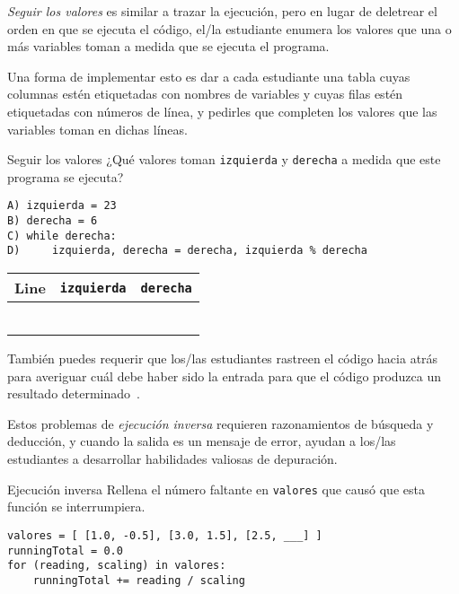 \emph{Seguir los valores} es similar a trazar la ejecución, 
pero en lugar de deletrear el orden en que se ejecuta el código, 
el/la estudiante enumera los valores que una o más variables toman
 a medida que se ejecuta el programa.

Una forma de implementar esto es dar a cada estudiante una tabla 
cuyas columnas estén etiquetadas con nombres de variables 
y cuyas filas estén etiquetadas con números de línea, 
y pedirles que completen los valores que las variables toman en dichas líneas.

\newpage
\begin{aside}{Seguir los valores}
  ¿Qué valores toman \texttt{izquierda} y \texttt{derecha} a medida que este programa se ejecuta?

\begin{verbatim}
A) izquierda = 23
B) derecha = 6
C) while derecha:
D)     izquierda, derecha = derecha, izquierda % derecha
\end{verbatim}
\end{aside}

\begin{center}
\begin{tabular}{|l|l|l|}
  \hline
  Line & \texttt{izquierda} & \texttt{derecha} \\
  \hline
  & & \\
  \hline
  & & \\
  \hline
  & & \\
  \hline
  & & \\
  \hline
  & & \\
  \hline
  & & \\
  \hline
\end{tabular}
\end{center}

También puedes requerir que  los/las estudiantes rastreen el código hacia atrás para averiguar cuál debe haber sido la entrada para que el código produzca un resultado determinado~\cite{Armo2008}.


Estos problemas de  \emph{ejecución inversa} requieren razonamientos de búsqueda y deducción, 
y cuando la salida es un mensaje de error, 
ayudan a los/las estudiantes a desarrollar habilidades valiosas de depuración.

\begin{aside}{Ejecución inversa}
  Rellena el número faltante en \texttt{valores}
  que causó que esta función se interrumpiera.

\begin{verbatim}
valores = [ [1.0, -0.5], [3.0, 1.5], [2.5, ___] ]
runningTotal = 0.0
for (reading, scaling) in valores:
    runningTotal += reading / scaling
\end{verbatim}
\end{aside}



